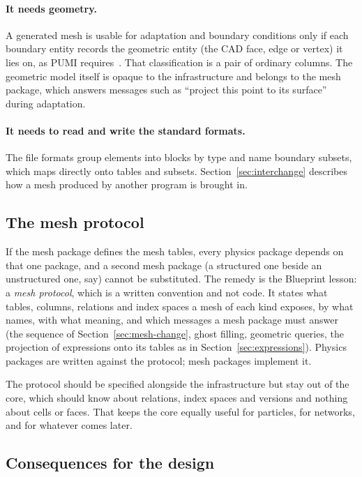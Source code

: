 \documentclass[11pt,a4paper]{article}
\begin{document}
\paragraph{It needs geometry.}  A generated mesh is usable for adaptation
and boundary conditions only if each boundary entity records the geometric
entity (the CAD face, edge or vertex) it lies on, as PUMI
requires~\cite{pumi}.  That classification is a pair of ordinary columns.
The geometric model itself is opaque to the infrastructure and belongs to
the mesh package, which answers messages such as \enquote{project this point
to its surface} during adaptation.

\paragraph{It needs to read and write the standard formats.}  The file
formats group elements into blocks by type and name boundary subsets, which
maps directly onto tables and subsets.  Section~\ref{sec:interchange}
describes how a mesh produced by another program is brought in.

\subsection{The mesh protocol}
\label{sec:mesh-protocol}

If the mesh package defines the mesh tables, every physics package depends on
that one package, and a second mesh package (a structured one beside an
unstructured one, say) cannot be substituted.  The remedy is the Blueprint
lesson: a \emph{mesh protocol}, which is a written convention and not code.
It states what tables, columns, relations and index spaces a mesh of each
kind exposes, by what names, with what meaning, and which messages a mesh
package must answer (the sequence of Section~\ref{sec:mesh-change}, ghost
filling, geometric queries, the projection of expressions onto its tables as
in Section~\ref{sec:expressions}).  Physics packages are written against the
protocol; mesh packages implement it.

The protocol should be specified alongside the infrastructure but stay out of
the core, which should know about relations, index spaces and versions and
nothing about cells or faces.  That keeps the core equally useful for
particles, for networks, and for whatever comes later.

\subsection{Consequences for the design}
\end{document}

